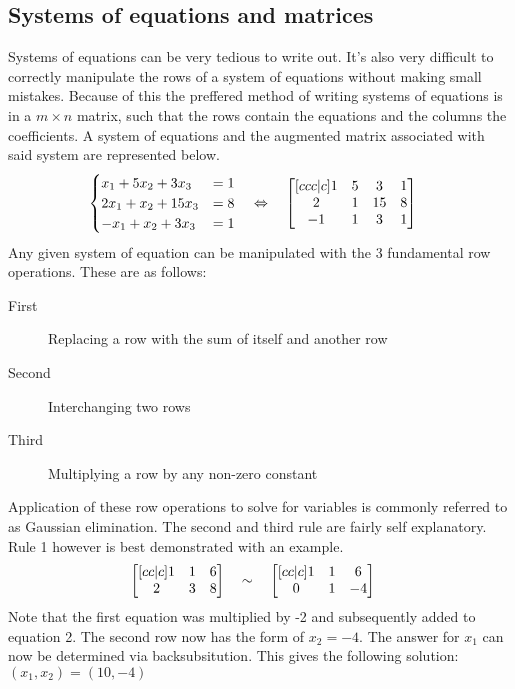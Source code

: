 \documentclass[11pt, a4paper]{article}
\begin{document}
\subsection{Systems of equations and matrices}
Systems of equations can be very tedious to write out. It's also very difficult
to correctly manipulate the rows of a system of equations without making small mistakes.
Because of this the preffered method of writing systems of equations is in a $m\times n$ matrix,
such that the rows contain the equations and the columns the coefficients. A system of
equations and the augmented matrix associated with said system are represented below.
\\
\begin{align*}
    \begin{cases} 
        x_1 + 5x_2 + 3x_3 &= 1 \\
        2x_1 + x_2 + 15x_3 &= 8 \\
        -x_1 + x_2 + 3x_3 &= 1 \\
       \end{cases}\hspace{-1em}
    \qquad &\Leftrightarrow \quad
    \begin{bmatrix}[ccc|c]
       1 & 5 & 3 & 1\\
       2 & 1 & 15 & 8\\
       -1 & 1 & 3 & 1\\
    \end{bmatrix}      
\end{align*}
Any given system of equation can be manipulated with the 3 fundamental row operations.
These are as follows:
\begin{description}
    \item[First] Replacing a row with the sum of itself and another row
    \item[Second] Interchanging two rows
    \item[Third]  Multiplying a row by any non-zero constant
\end{description}
Application of these row operations to solve for variables is commonly referred to as
Gaussian elimination. The second and third rule are fairly self explanatory.
Rule 1 however is best demonstrated with an example.
\begin{align*}
    \begin{bmatrix}[cc|c]
        1 & 1 & 6\\
        2 & 3 & 8\\
    \end{bmatrix}\hspace{-1em}
    \qquad &\sim \quad
    \begin{bmatrix}[cc|c]
       1 & 1 & 6 \\
       0 & 1 & -4 \\
    \end{bmatrix}      
\end{align*}
Note that the first equation was multiplied by -2 and subsequently added to equation 2.
The second row now has the form of $x_2 = -4$. The answer for $x_1$ can now be determined via
backsubsitution. This gives the following solution: $(x_1, x_2) = (10, -4)$
\end{document}
